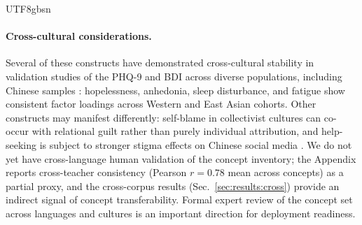 \documentclass[lettersize,journal]{IEEEtran}
\renewcommand{\arraystretch}{0.99}
\begin{document}
\begin{CJK*}{UTF8}{gbsn}
\paragraph{Cross-cultural considerations.}
Several of these constructs have demonstrated cross-cultural stability in validation studies of the PHQ-9 and BDI across diverse populations, including Chinese samples \cite{kroenke2001phq,beck1972measuring}: hopelessness, anhedonia, sleep disturbance, and fatigue show consistent factor loadings across Western and East Asian cohorts. Other constructs may manifest differently: self-blame in collectivist cultures can co-occur with relational guilt rather than purely individual attribution, and help-seeking is subject to stronger stigma effects on Chinese social media \cite{koh2020concept}. We do not yet have cross-language human validation of the concept inventory; the Appendix reports cross-teacher consistency (Pearson $r{=}0.78$ mean across concepts) as a partial proxy, and the cross-corpus results (Sec.~\ref{sec:results:cross}) provide an indirect signal of concept transferability. Formal expert review of the concept set across languages and cultures is an important direction for deployment readiness.
\begin{table}[t]
\centering
\caption{Concept inventory ($K{=}12$) with psychological grounding.}
\label{tab:concepts}
\renewcommand{\arraystretch}{1.05}
\end{table}
\end{CJK*}
\end{document}
